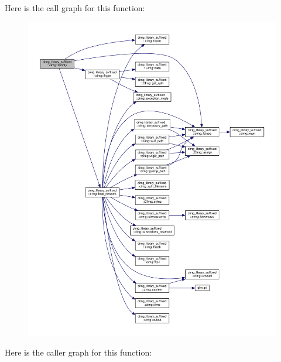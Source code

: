 Here is the call graph for this function\+:
\nopagebreak
\begin{figure}[H]
\begin{center}
\leavevmode
\includegraphics[width=350pt]{d4/d9b/namespacecimg__library__suffixed_1_1cimg_a0f3577978081461118330fc3ecd4b9db_cgraph}
\end{center}
\end{figure}
Here is the caller graph for this function\+:
\nopagebreak
